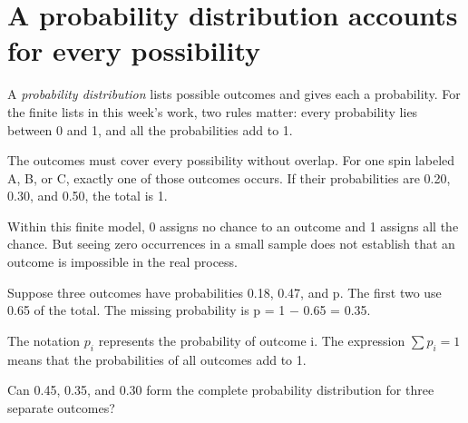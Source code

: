 \documentclass[12pt,letterpaper]{article}
\begin{document}
\section{A probability distribution accounts for every possibility}

A \emph{probability distribution} lists possible outcomes and gives each a probability. For the finite lists in this week's work, two rules matter: every probability lies between 0 and 1, and all the probabilities add to 1.


The outcomes must cover every possibility without overlap. For one spin labeled A, B, or C, exactly one of those outcomes occurs. If their probabilities are 0.20, 0.30, and 0.50, the total is 1.


\par{}\par\medskip

Within this finite model, 0 assigns no chance to an outcome and 1 assigns all the chance. But seeing zero occurrences in a small sample does not establish that an outcome is impossible in the real process.


\begin{tcolorbox}[title={Finding a missing probability},breakable]

Suppose three outcomes have probabilities 0.18, 0.47, and p. The first two use 0.65 of the total. The missing probability is p = 1 $-$ 0.65 = 0.35.


\end{tcolorbox}

The notation \(p_i\) represents the probability of outcome i. The expression \(\sum p_i=1\) means that the probabilities of all outcomes add to 1.


\begin{tcolorbox}[title={Pause and try 8},breakable]
Can 0.45, 0.35, and 0.30 form the complete probability distribution for three separate outcomes?
\end{tcolorbox}
\end{document}
